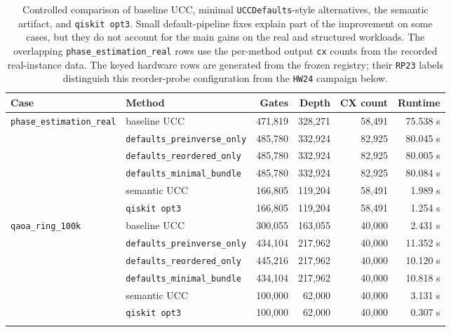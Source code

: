 \begin{table}[t]
\centering
\scriptsize
\begin{tabular}{llrrrr}
\toprule
Case & Method & Gates & Depth & CX count & Runtime \\
\midrule
\multirow{6}{*}{\texttt{phase\_estimation\_real}}
  & baseline UCC & 471{,}819 & 328{,}271 & 58{,}491 & 75.538 s \\
  & \texttt{defaults\_preinverse\_only} & 485{,}780 & 332{,}924 & 82{,}925 & 80.045 s \\
  & \texttt{defaults\_reordered\_only} & 485{,}780 & 332{,}924 & 82{,}925 & 80.005 s \\
  & \texttt{defaults\_minimal\_bundle} & 485{,}780 & 332{,}924 & 82{,}925 & 80.084 s \\
  & semantic UCC & 166{,}805 & 119{,}204 & 58{,}491 & 1.989 s \\
  & \texttt{qiskit opt3} & 166{,}805 & 119{,}204 & 58{,}491 & 1.254 s \\
\midrule
\multirow{6}{*}{\texttt{qaoa\_ring\_100k}}
  & baseline UCC & 300{,}055 & 163{,}055 & 40{,}000 & 2.431 s \\
  & \texttt{defaults\_preinverse\_only} & 434{,}104 & 217{,}962 & 40{,}000 & 11.352 s \\
  & \texttt{defaults\_reordered\_only} & 445{,}216 & 217{,}962 & 40{,}000 & 10.120 s \\
  & \texttt{defaults\_minimal\_bundle} & 434{,}104 & 217{,}962 & 40{,}000 & 10.818 s \\
  & semantic UCC & 100{,}000 & 62{,}000 & 40{,}000 & 3.131 s \\
  & \texttt{qiskit opt3} & 100{,}000 & 62{,}000 & 40{,}000 & 0.307 s \\
\midrule
\\
\bottomrule
\end{tabular}
\caption{Controlled comparison of baseline UCC, minimal \texttt{UCCDefaults}-style alternatives, the semantic artifact, and \texttt{qiskit opt3}. Small default-pipeline fixes explain part of the improvement on some cases, but they do not account for the main gains on the real and structured workloads. The overlapping \texttt{phase\_estimation\_real} rows use the per-method output \texttt{cx} counts from the recorded real-instance data.  The keyed hardware rows are generated from the frozen registry; their \texttt{RP23} labels distinguish this reorder-probe configuration from the \texttt{HW24} campaign below.}
\label{tab:defaults-vs-full}
\end{table}

